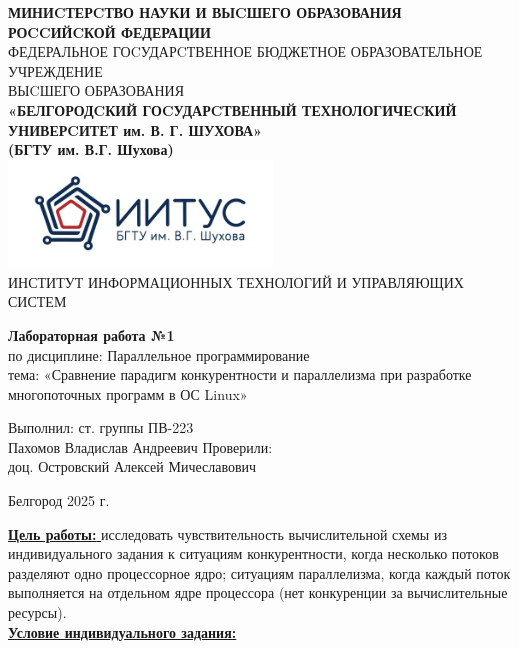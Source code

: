 \documentclass[a4paper,14pt]{extarticle}
\newcommand\textbox[1]{
	\parbox{.45\textwidth}{#1}
}
\begin{document}
\begin{center}
    \small{
        \textbf{МИНИCТЕРCТВО НАУКИ И ВЫCШЕГО ОБРАЗОВАНИЯ РОCCИЙCКОЙ ФЕДЕРАЦИИ}\\
        ФЕДЕРАЛЬНОЕ ГОCУДАРCТВЕННОЕ БЮДЖЕТНОЕ ОБРАЗОВАТЕЛЬНОЕ УЧРЕЖДЕНИЕ\\ВЫCШЕГО ОБРАЗОВАНИЯ \\
        \textbf{«БЕЛГОРОДCКИЙ ГОCУДАРCТВЕННЫЙ ТЕХНОЛОГИЧЕCКИЙ\\УНИВЕРCИТЕТ им. В. Г. ШУХОВА»\\ (БГТУ им. В.Г. Шухова)} \\
        \bigbreak
        \includegraphics[width=70mm]{log}\\
        ИНСТИТУТ ИНФОРМАЦИОННЫХ ТЕХНОЛОГИЙ И УПРАВЛЯЮЩИХ СИСТЕМ\\}
\end{center}

\vfill
\begin{center}
    \large{
        \textbf{
            Лабораторная работа №1}}\\
    \normalsize{
        по дисциплине: Параллельное программирование \\
        тема: «Сравнение парадигм конкурентности и параллелизма при разработке
        многопоточных программ в ОС Linux»}
\end{center}
\vfill
\hfill\textbox{
    Выполнил: ст. группы ПВ-223\\Пахомов Владислав Андреевич
    \bigbreak
    Проверили: \\доц. Островский Алексей Мичеславович
}
\vfill\begin{center}
    Белгород 2025 г.
\end{center}
\newpage
\underline{\textbf{Цель работы: }}исследовать чувствительность вычислительной схемы из индивидуального задания к ситуациям конкурентности, 
когда несколько потоков разделяют одно процессорное ядро; 
ситуациям параллелизма, когда каждый поток выполняется на отдельном ядре процессора
(нет конкуренции за вычислительные ресурсы).\\
\underline{\textbf{Условие индивидуального задания: }}\\
\end{document}
